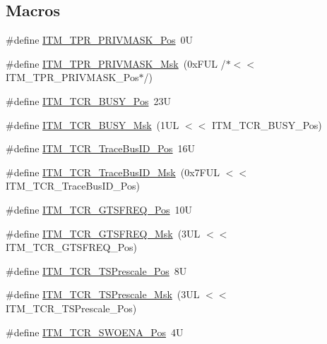 \subsection*{Macros}
\begin{DoxyCompactItemize}
\item 
\#define \hyperlink{group___c_m_s_i_s___i_t_m_ga7abe5e590d1611599df87a1884a352e8}{I\+T\+M\+\_\+\+T\+P\+R\+\_\+\+P\+R\+I\+V\+M\+A\+S\+K\+\_\+\+Pos}~0U
\item 
\#define \hyperlink{group___c_m_s_i_s___i_t_m_ga168e089d882df325a387aab3a802a46b}{I\+T\+M\+\_\+\+T\+P\+R\+\_\+\+P\+R\+I\+V\+M\+A\+S\+K\+\_\+\+Msk}~(0x\+F\+U\+L /$\ast$$<$$<$ I\+T\+M\+\_\+\+T\+P\+R\+\_\+\+P\+R\+I\+V\+M\+A\+S\+K\+\_\+\+Pos$\ast$/)
\item 
\#define \hyperlink{group___c_m_s_i_s___i_t_m_ga9174ad4a36052c377cef4e6aba2ed484}{I\+T\+M\+\_\+\+T\+C\+R\+\_\+\+B\+U\+S\+Y\+\_\+\+Pos}~23U
\item 
\#define \hyperlink{group___c_m_s_i_s___i_t_m_ga43ad7cf33de12f2ef3a412d4f354c60f}{I\+T\+M\+\_\+\+T\+C\+R\+\_\+\+B\+U\+S\+Y\+\_\+\+Msk}~(1\+U\+L $<$$<$ I\+T\+M\+\_\+\+T\+C\+R\+\_\+\+B\+U\+S\+Y\+\_\+\+Pos)
\item 
\#define \hyperlink{group___c_m_s_i_s___i_t_m_gaca0281de867f33114aac0636f7ce65d3}{I\+T\+M\+\_\+\+T\+C\+R\+\_\+\+Trace\+Bus\+I\+D\+\_\+\+Pos}~16U
\item 
\#define \hyperlink{group___c_m_s_i_s___i_t_m_ga60c20bd9649d1da5a2be8e656ba19a60}{I\+T\+M\+\_\+\+T\+C\+R\+\_\+\+Trace\+Bus\+I\+D\+\_\+\+Msk}~(0x7\+F\+U\+L $<$$<$ I\+T\+M\+\_\+\+T\+C\+R\+\_\+\+Trace\+Bus\+I\+D\+\_\+\+Pos)
\item 
\#define \hyperlink{group___c_m_s_i_s___i_t_m_ga96c7c7cbc0d98426c408090b41f583f1}{I\+T\+M\+\_\+\+T\+C\+R\+\_\+\+G\+T\+S\+F\+R\+E\+Q\+\_\+\+Pos}~10U
\item 
\#define \hyperlink{group___c_m_s_i_s___i_t_m_gade862cf009827f7f6748fc44c541b067}{I\+T\+M\+\_\+\+T\+C\+R\+\_\+\+G\+T\+S\+F\+R\+E\+Q\+\_\+\+Msk}~(3\+U\+L $<$$<$ I\+T\+M\+\_\+\+T\+C\+R\+\_\+\+G\+T\+S\+F\+R\+E\+Q\+\_\+\+Pos)
\item 
\#define \hyperlink{group___c_m_s_i_s___i_t_m_gad7bc9ee1732032c6e0de035f0978e473}{I\+T\+M\+\_\+\+T\+C\+R\+\_\+\+T\+S\+Prescale\+\_\+\+Pos}~8U
\item 
\#define \hyperlink{group___c_m_s_i_s___i_t_m_ga7a723f71bfb0204c264d8dbe8cc7ae52}{I\+T\+M\+\_\+\+T\+C\+R\+\_\+\+T\+S\+Prescale\+\_\+\+Msk}~(3\+U\+L $<$$<$ I\+T\+M\+\_\+\+T\+C\+R\+\_\+\+T\+S\+Prescale\+\_\+\+Pos)
\item 
\#define \hyperlink{group___c_m_s_i_s___i_t_m_ga7a380f0c8078f6560051406583ecd6a5}{I\+T\+M\+\_\+\+T\+C\+R\+\_\+\+S\+W\+O\+E\+N\+A\+\_\+\+Pos}~4U

\end{DoxyCompactItemize}
